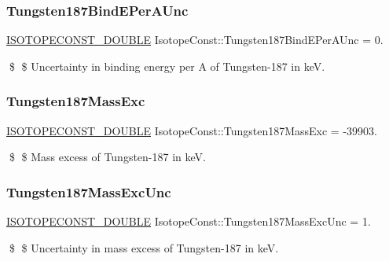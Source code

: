 \subsubsection{\texorpdfstring{Tungsten187\+Bind\+E\+Per\+A\+Unc}{Tungsten187BindEPerAUnc}}
{\footnotesize\ttfamily \mbox{\hyperlink{group___isotope_const-_macros_ga8f45a7272ce02c0b4c65c44636ed719a}{I\+S\+O\+T\+O\+P\+E\+C\+O\+N\+S\+T\+\_\+\+D\+O\+U\+B\+LE}} Isotope\+Const\+::\+Tungsten187\+Bind\+E\+Per\+A\+Unc = 0.}

\$ \$ Uncertainty in binding energy per A of Tungsten-\/187 in keV. \mbox{\label{group___isotope_const-_tungsten-_w187_gabae4008d5c4ffe45b0cd6d77f7976b3b}} 
\subsubsection{\texorpdfstring{Tungsten187\+Mass\+Exc}{Tungsten187MassExc}}
{\footnotesize\ttfamily \mbox{\hyperlink{group___isotope_const-_macros_ga8f45a7272ce02c0b4c65c44636ed719a}{I\+S\+O\+T\+O\+P\+E\+C\+O\+N\+S\+T\+\_\+\+D\+O\+U\+B\+LE}} Isotope\+Const\+::\+Tungsten187\+Mass\+Exc = -\/39903.}

\$ \$ Mass excess of Tungsten-\/187 in keV. \mbox{\label{group___isotope_const-_tungsten-_w187_ga778730437ee2ca264885164b12385a6d}} 
\subsubsection{\texorpdfstring{Tungsten187\+Mass\+Exc\+Unc}{Tungsten187MassExcUnc}}
{\footnotesize\ttfamily \mbox{\hyperlink{group___isotope_const-_macros_ga8f45a7272ce02c0b4c65c44636ed719a}{I\+S\+O\+T\+O\+P\+E\+C\+O\+N\+S\+T\+\_\+\+D\+O\+U\+B\+LE}} Isotope\+Const\+::\+Tungsten187\+Mass\+Exc\+Unc = 1.}

\$ \$ Uncertainty in mass excess of Tungsten-\/187 in keV. \mbox{\label{group___isotope_const-_tungsten-_w187_gafefc037824f28e84dcf1475008cf645f}} 
